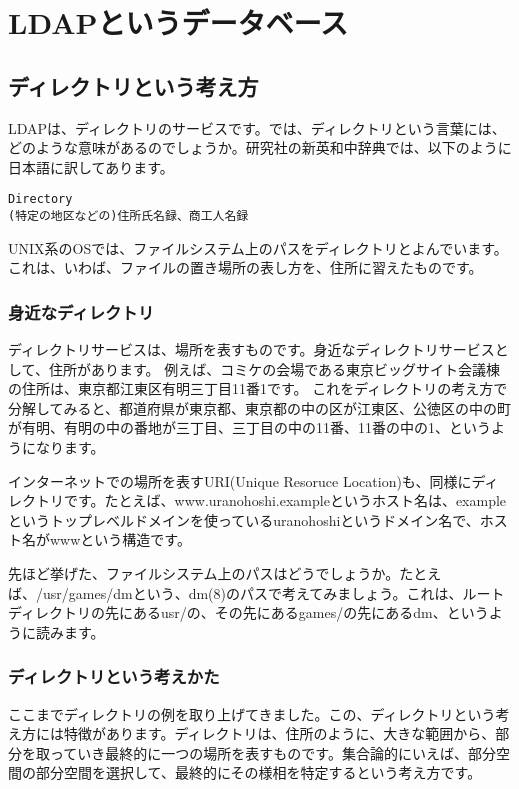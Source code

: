 \chapter{LDAPというデータベース}

\section{ディレクトリという考え方}

LDAPは、ディレクトリのサービスです。では、ディレクトリという言葉には、どのような意味があるのでしょうか。研究社の新英和中辞典では、以下のように日本語に訳してあります。

\begin{verbatim}
Directory
(特定の地区などの)住所氏名録、商工人名録
\end{verbatim}

UNIX系のOSでは、ファイルシステム上のパスをディレクトリとよんでいます。これは、いわば、ファイルの置き場所の表し方を、住所に習えたものです。

\subsection{身近なディレクトリ}

ディレクトリサービスは、場所を表すものです。身近なディレクトリサービスとして、住所があります。
例えば、コミケの会場である東京ビッグサイト会議棟の住所は、東京都江東区有明三丁目11番1です。
これをディレクトリの考え方で分解してみると、都道府県が東京都、東京都の中の区が江東区、公徳区の中の町が有明、有明の中の番地が三丁目、三丁目の中の11番、11番の中の1、というようになります。

インターネットでの場所を表すURI(Unique Resoruce Location)も、同様にディレクトリです。たとえば、www.uranohoshi.exampleというホスト名は、exampleというトップレベルドメインを使っているuranohoshiというドメイン名で、ホスト名がwwwという構造です。

先ほど挙げた、ファイルシステム上のパスはどうでしょうか。たとえば、/usr/games/dmという、dm(8)のパスで考えてみましょう。これは、ルートディレクトリの先にあるusr/の、その先にあるgames/の先にあるdm、というように読みます。

\subsection{ディレクトリという考えかた}

ここまでディレクトリの例を取り上げてきました。この、ディレクトリという考え方には特徴があります。ディレクトリは、住所のように、大きな範囲から、部分を取っていき最終的に一つの場所を表すものです。集合論的にいえば、部分空間の部分空間を選択して、最終的にその様相を特定するという考え方です。

